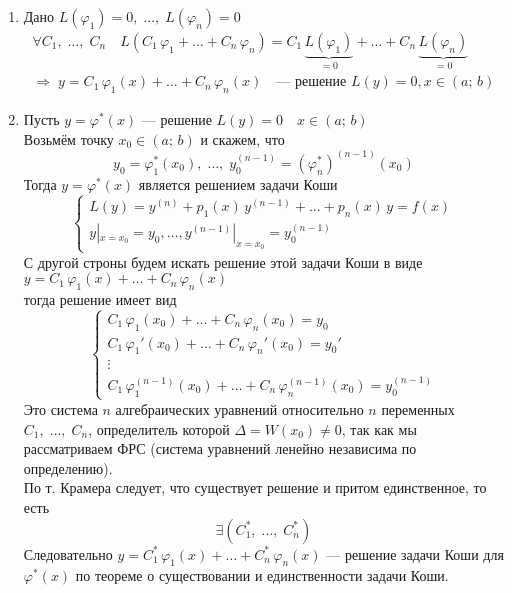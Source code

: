 \begin{Proof}
    \begin{enumerate}
        \item Дано $L(\varphi_1) = 0,\; \dots,\; L(\varphi_n) = 0$
        \begin{gather*}
            \forall C_1,\; \dots,\; C_n \quad L(C_1\,\varphi_1 + \dots + C_n\,\varphi_n) = C_1\,\underbrace{L(\varphi_1)}_{ = 0} + \dots + C_n\,\underbrace{L(\varphi_n)}_{ = 0}\\
            \Rightarrow \; y = C_1\,\varphi_1(x) + \dots + C_n\,\varphi_n(x) \quad \text{--- решение } L(y) = 0, x \in (a;\, b)
        \end{gather*}
            
        \item Пусть $y = \varphi^*(x)$ --- решение $L(y) = 0 \quad x \in (a;\,b)$\\
        Возьмём точку $x_0 \in (a;\,b)$ и скажем, что
        \[
            y_0 = \varphi_1^*(x_0),\; \dots,\; y_0^{(n-1)} = (\varphi_n^*)^{(n-1)}(x_0)
        \]
        Тогда $y = \varphi^*(x)$ является решением задачи Коши
        \[
            \begin{cases}
                L(y) = y^{(n)}+p_1(x)\,y^{(n-1)}+\dots+p_n(x)\,y=f(x)\\
                y|_{x=x_0}=y_0, \dots , y^{(n-1)}|_{x=x_0}=y_0^{(n-1)}
            \end{cases}
        \]
        С другой строны будем искать решение этой задачи Коши в виде $y = C_1\,\varphi_1(x) + \dots + C_n\,\varphi_n(x)$\\
        тогда решение имеет вид
        \[
            \begin{cases}
                C_1\,\varphi_1(x_0) + \dots + C_n\,\varphi_n(x_0) = y_0\\
                C_1\,\varphi_1'(x_0) + \dots + C_n\,\varphi_n'(x_0) = y_0'\\
                \vdots\\
                C_1\,\varphi_1^{(n-1)}(x_0) + \dots + C_n\,\varphi_n^{(n-1)}(x_0) = y_0^{(n-1)}
            \end{cases}
        \]
        Это система $n$ алгебраических уравнений относительно $n$ переменных $C_1,\; \dots,\; C_n$, определитель которой $\Delta = W(x_0) \neq 0$, так как мы рассматриваем ФРС (система уравнений ленейно независима по определению).\\
        
        По т. Крамера следует, что существует решение и притом единственное, то есть
        \[
            \exists (C_1^*,\; \dots,\; C_n^*)
        \]
        Следовательно $y = C_1^*\,\varphi_1(x) + \dots + C_n^*\,\varphi_n(x)$ --- решение задачи Коши для $\varphi^*(x)$ по теореме о существовании и единственности задачи Коши.
    \end{enumerate}
\end{Proof}

